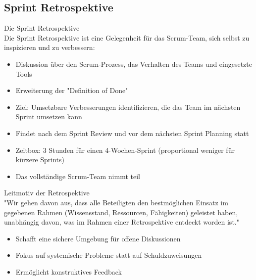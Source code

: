 \subsection{Sprint Retrospektive}

\begin{definition}{Die Sprint Retrospektive}\\
    Die Sprint Retrospektive ist eine Gelegenheit für das Scrum-Team, sich selbst zu inspizieren und zu verbessern:
    \begin{itemize}
        \item Diskussion über den Scrum-Prozess, das Verhalten des Teams und eingesetzte Tools
        \item Erweiterung der "Definition of Done"
        \item Ziel: Umsetzbare Verbesserungen identifizieren, die das Team im nächsten Sprint umsetzen kann
        \item Findet nach dem Sprint Review und vor dem nächsten Sprint Planning statt
        \item Zeitbox: 3 Stunden für einen 4-Wochen-Sprint (proportional weniger für kürzere Sprints)
        \item Das vollständige Scrum-Team nimmt teil
    \end{itemize}
\end{definition}

\begin{concept}{Leitmotiv der Retrospektive}\\
    "Wir gehen davon aus, dass alle Beteiligten den bestmöglichen Einsatz im gegebenen Rahmen (Wissensstand, Ressourcen, Fähigkeiten) geleistet haben, unabhängig davon, was im Rahmen einer Retrospektive entdeckt worden ist."
    
    \begin{itemize}
        \item Schafft eine sichere Umgebung für offene Diskussionen
        \item Fokus auf systemische Probleme statt auf Schuldzuweisungen
        \item Ermöglicht konstruktives Feedback
    \end{itemize}
\end{concept}

